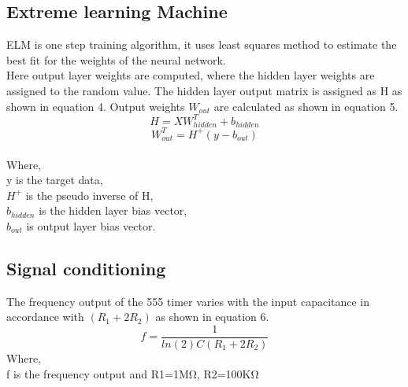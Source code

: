 \documentclass[conference]{IEEEtran}
\begin{document}
\subsection{Extreme learning Machine}
ELM is one step training algorithm, it uses least squares method to estimate the best fit for the weights of the neural network. \\
Here output layer weights are computed, where the hidden layer weights are assigned to the random value. The hidden layer output matrix is assigned as H as shown in equation 4. Output weights $W_{out}$ are calculated as shown in equation 5.
\begin{equation} \label{eq:4}
H=XW_{hidden}^T+b_{hidden}
\end{equation}
\begin{equation} \label{eq:5}
W_{out}^T=H^+(y-b_{out})
\end{equation}
\\Where,\\
y is the target data,\\
$H^+$ is the pseudo inverse of H,\\
$b_{hidden}$ is the hidden layer bias vector,\\
$b_{out}$ is output layer bias vector.\\
\subsection{Signal conditioning}
The frequency output of the 555 timer varies with the input capacitance in accordance with $(R_1+2R_2)$ as shown in equation 6.\\
\begin{equation}\label{eq:6}
f=\frac{1}{ln (2)C(R_1+2R_2)}
\end{equation}
Where, \\
f is the frequency output and R1=1MΩ, R2=100KΩ\\
\end{document}
